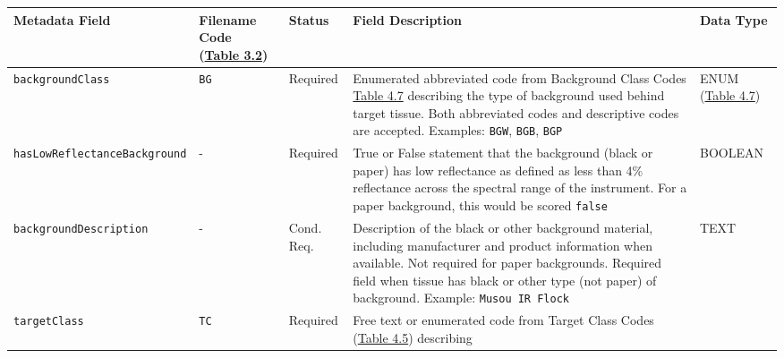 \documentclass[
  letterpaper,
  DIV=11,
  numbers=noendperiod]{scrreprt}
\begin{document}
\begin{longtable}[]{@{}
  >{\raggedright\arraybackslash}p{}
  >{\raggedright\arraybackslash}p{}
  >{\raggedright\arraybackslash}p{}
  >{\raggedright\arraybackslash}p{}
  >{\raggedright\arraybackslash}p{}@{}}
\toprule\noalign{}
\begin{minipage}[b]{\linewidth}\raggedright
Metadata Field
\end{minipage} & \begin{minipage}[b]{\linewidth}\raggedright
Filename Code (\hyperref[tbl-3-2]{Table 3.2})
\end{minipage} & \begin{minipage}[b]{\linewidth}\raggedright
Status
\end{minipage} & \begin{minipage}[b]{\linewidth}\raggedright
Field Description
\end{minipage} & \begin{minipage}[b]{\linewidth}\raggedright
Data Type
\end{minipage} \\
\midrule\noalign{}
\endhead
\bottomrule\noalign{}
\endlastfoot
\texttt{backgroundClass} & \texttt{BG} & Required & Enumerated
abbreviated code from Background Class Codes \hyperref[tbl-4-7]{Table
4.7} describing the type of background used behind target tissue. Both
abbreviated codes and descriptive codes are accepted. Examples:
\texttt{BGW}, \texttt{BGB}, \texttt{BGP} & ENUM
(\hyperref[tbl-4-7]{Table 4.7}) \\
\texttt{hasLowReflectanceBackground} & - & Required & True or False
statement that the background (black or paper) has low reflectance as
defined as less than 4\% reflectance across the spectral range of the
instrument. For a paper background, this would be scored \texttt{false}
& BOOLEAN \\
\texttt{backgroundDescription} & - & Cond. Req. & Description of the
black or other background material, including manufacturer and product
information when available. Not required for paper backgrounds. Required
field when tissue has black or other type (not paper) of background.
Example: \texttt{Musou\ IR\ Flock} & TEXT \\
\texttt{targetClass} & \texttt{TC} & Required & Free text or enumerated
code from Target Class Codes (\hyperref[tbl-4-5]{Table 4.5}) describing

\end{longtable}
\end{document}
